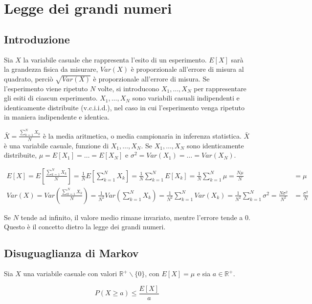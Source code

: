 \documentclass{subfiles}
\begin{document}
\section{Legge dei grandi numeri}

\subsection{Introduzione}

Sia $X$ la variabile casuale che rappresenta l'esito di un esperimento.
$E[X]$ sarà la grandezza fisica da misurare, $Var(X)$ è proporzionale all'errore di misura al quadrato, perciò $\sqrt{Var(X)}$ è proporzionale all'errore di misura.
Se l'esperimento viene ripetuto $N$ volte, si introducono $X_1, \dots, X_N$ per rappresentare gli esiti di ciascun esperimento.
$X_1, \dots, X_N$ sono variabili casuali indipendenti e identicamente distribuite (v.c.i.i.d.), nel caso in cui l'esperimento venga ripetuto in maniera indipendente e identica.

\noindent
$\bar{X} = \frac{\sum^N_{k=1}X_k}{N}$ è la media aritmetica, o media campionaria in inferenza statistica.
$\bar{X}$ è una variabile casuale, funzione di $X_1, \dots, X_N$.
Se $X_1, \dots, X_N$ sono identicamente distribuite, $\mu=E[X_1]=\dots=E[X_N]$ e $\sigma^2=Var(X_1)=\dots=Var(X_N)$.

$$
\begin{matrix}
E[X] = E[\frac{\sum^N_{k=1}X_k}{N}] = \frac{1}{N} E[\sum^N_{k=1}X_k] = \frac{1}{N} \sum^N_{k=1} E[X_k] = \frac{1}{N} \sum^N_{k=1} \mu = \frac{N\mu}{N} &= \mu \\
Var(X) = Var(\frac{\sum^N_{k=1}X_k}{N}) = \frac{1}{N^2} Var(\sum^N_{k=1}X_k) = \frac{1}{N^2} \sum^N_{k=1} Var(X_k) = \frac{1}{N^2} \sum^N_{k=1} \sigma^2 = \frac{N\sigma^2}{N^2} &= \frac{\sigma^2}{N}
\end{matrix}
$$

\noindent
Se $N$ tende ad infinito, il valore medio rimane invariato, mentre l'errore tende a 0. Questo è il concetto dietro la legge dei grandi numeri.

\subsection{Disuguaglianza di Markov}

Sia $X$ una variabile casuale con valori $\mathbb{R}^+ \backslash \{0\}$, con $E[X]=\mu$ e sia $a \in \mathbb{R}^+$.

$$
P(X \geq a) \leq \frac{E[X]}{a}
$$
\end{document}
